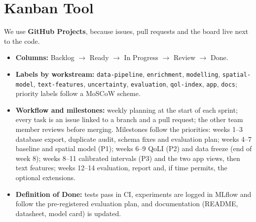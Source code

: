 \documentclass[11pt,a4paper]{article}
\begin{document}
\section{Kanban Tool}
We use \textbf{GitHub Projects}, because issues, pull requests and the board live next to the code.
\begin{itemize}
    \item \textbf{Columns:} Backlog $\rightarrow$ Ready $\rightarrow$ In Progress $\rightarrow$ Review $\rightarrow$ Done.
    \item \textbf{Labels by workstream:} \texttt{data-pipeline}, \texttt{enrichment}, \texttt{modelling}, \texttt{spatial-model}, \texttt{text-features}, \texttt{uncertainty}, \texttt{evaluation}, \texttt{qol-index}, \texttt{app}, \texttt{docs}; priority labels follow a MoSCoW scheme.
    \item \textbf{Workflow and milestones:} weekly planning at the start of each sprint; every task is an issue linked to a branch and a pull request; the other team member reviews before merging. Milestones follow the priorities: weeks 1--3 database export, duplicate audit, schema fixes and evaluation plan; weeks 4--7 baseline and spatial model (P1); weeks 6--9 QoLI (P2) and data freeze (end of week 8); weeks 8--11 calibrated intervals (P3) and the two app views, then text features; weeks 12--14 evaluation, report and, if time permits, the optional extensions.
    \item \textbf{Definition of Done:} tests pass in CI, experiments are logged in MLflow and follow the pre-registered evaluation plan, and documentation (README, datasheet, model card) is updated.
\end{itemize}

\end{document}
